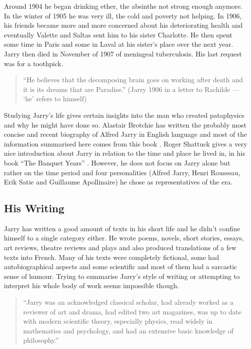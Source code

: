 Around 1904 he began drinking ether, the absinthe not strong enough anymore. In the winter of 1905 he was very ill, the cold and poverty not helping. In 1906, his friends became more and more concerned about his deteriorating health and eventually Valette and Saltas sent him to his sister Charlotte. He then spent some time in Paris and some in Laval at his sister's place over the next year. Jarry then died in November of 1907 of meningeal tuberculosis. His last request was for a toothpick.

\begin{quote}
  ``He believes that the decomposing brain goes on working after death and it is its dreams that are Paradise.'' (Jarry 1906 in a letter to Rachilde \citep{Brotchie2007} --- `he' refers to himself)
\end{quote}

Studying Jarry's life gives certain insights into the man who created pataphysics and why he might have done so. Alastair Brotchie has written the probably most concise and recent biography of Alfred Jarry in English language and most of the information summarised here comes from this book \citep{Brotchie2011}. Roger Shattuck gives a very nice introduction about Jarry in relation to the time and place he lived in, in his book ``The Banquet Years'' \citep{Shattuck1959}. However, he does not focus on Jarry alone but rather on the time period and four personalities (Alfred Jarry, Henri Rousseau, Erik Satie and Guillaume Apollinaire) he chose as representatives of the era.


\subsection*{His Writing}

Jarry has written a good amount of texts in his short life and he didn't confine himself to a single category either. He wrote poems, novels, short stories, essays, art reviews, theatre reviews and plays and also produced translations of a few texts into French. Many of his texts were completely fictional, some had autobiographical aspects and some scientific and most of them had a sarcastic sense of humour. Trying to summarise Jarry's style of writing or attempting to interpret his whole body of work seems impossible though.

\begin{quote}
  ``Jarry was an acknowledged classical scholar, had already worked as a reviewer of art and drama, had edited two art magazines, was up to date with modern scientific theory, especially physics, read widely in mathematics and psychology, and had an extensive basic knowledge of philosophy.'' \citep{Brotchie2011}
\end{quote}


